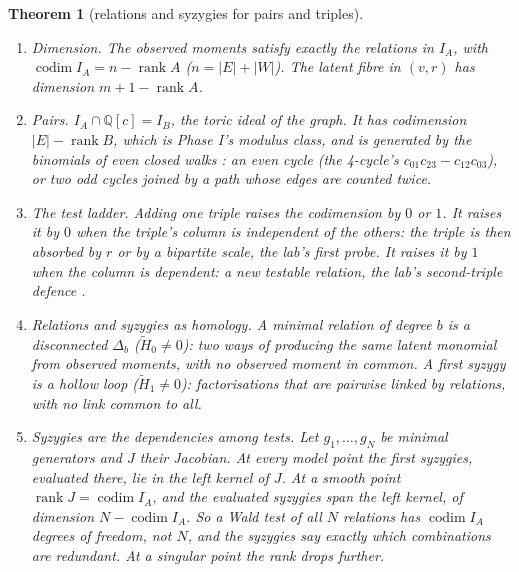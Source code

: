 \documentclass[11pt]{article}
\newtheorem{theorem}{Theorem}\newtheorem{proposition}[theorem]{Proposition}\newtheorem{lemma}[theorem]{Lemma}\newtheorem{corollary}[theorem]{Corollary}
\theoremstyle{definition}\newtheorem{definition}[theorem]{Definition}\newtheorem{remark}[theorem]{Remark}\newtheorem{example}[theorem]{Example}
\begin{document}
\begin{theorem}[relations and syzygies for pairs and triples]\label{thm:syz}
\begin{enumerate}
\item[(1)] \emph{Dimension.} The observed moments satisfy exactly the relations in $I_A$, with $\operatorname{codim}I_A=n-\operatorname{rank}A$
  ($n=|E|+|W|$). The latent fibre in $(v,r)$ has dimension $m+1-\operatorname{rank}A$.
\item[(2)] \emph{Pairs.} $I_A\cap\mathbb Q[c]=I_B$, the toric ideal of the graph. It has codimension $|E|-\operatorname{rank}B$, which is
  Phase I's modulus class, and is generated by the binomials of even closed walks \cite{Villarreal1995,OhsugiHibi1999}: an even cycle
  (the 4-cycle's $c_{01}c_{23}-c_{12}c_{03}$), or two odd cycles joined by a path whose edges are counted twice.
\item[(3)] \emph{The test ladder.} Adding one triple raises the codimension by $0$ or $1$. It raises it by $0$ when the triple's column
  is independent of the others: the triple is then absorbed by $r$ or by a bipartite scale, the lab's first probe. It raises it by $1$
  when the column is dependent: a new testable relation, the lab's second-triple defence \cite[Corollary ``second triple'']{Lab}.
\item[(4)] \emph{Relations and syzygies as homology.} A minimal relation of degree $b$ is a disconnected $\Delta_b$
  ($\tilde H_0\ne0$): two ways of producing the same latent monomial from observed moments, with no observed moment in common. A first
  syzygy is a hollow loop ($\tilde H_1\ne0$): factorisations that are pairwise linked by relations, with no link common to all.
\item[(5)] \emph{Syzygies are the dependencies among tests.} Let $g_1,\dots,g_N$ be minimal generators and $J$ their Jacobian. At every
  model point the first syzygies, evaluated there, lie in the left kernel of $J$. At a smooth point $\operatorname{rank}J=\operatorname{codim}I_A$,
  and the evaluated syzygies span the left kernel, of dimension $N-\operatorname{codim}I_A$. So a Wald test of all $N$ relations has
  $\operatorname{codim}I_A$ degrees of freedom, not $N$, and the syzygies say exactly which combinations are redundant. At a singular
  point the rank drops further.
\end{enumerate}
\end{theorem}
\end{document}
